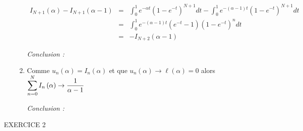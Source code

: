 \documentclass[a4paper, 11pt,reqno]{article}
\begin{document}
\begin{enumerate}
\begin{enumerate}
\begin{eqnarray*}
I_{N+1}\left( \alpha \right) -I_{N+1}\left( \alpha -1\right) 
&=&\int_{0}^{1}e^{-\alpha t}\left( 1-e^{-t}\right)
^{N+1}dt-\int_{0}^{1}e^{-\left( \alpha -1\right) t}\left( 1-e^{-t}\right)
^{N+1}dt \\
&=&\int_{0}^{1}e^{-\left( \alpha -1\right) t}\left( e^{-t}-1\right) \left(
1-e^{-t}\right) ^{n}dt \\
&=&-I_{N+2}\left( \alpha -1\right) 
\end{eqnarray*}

\textsl{Conclusion : }

\item Comme $u_{n}\left( \alpha \right) =I_{n}\left( \alpha \right) $ et que 
$u_{n}\left( \alpha \right) \rightarrow \ell \left( \alpha \right) =0$ alors 
$\displaystyle\sum_{n=0}^{N}I_{n}\left( \alpha \right) \rightarrow \dfrac{1}{%
\alpha -1}$

\textsl{Conclusion : }
\end{enumerate}
\end{enumerate}

\begin{center}
{\LARGE EXERCICE 2}
\end{center}
\end{document}
